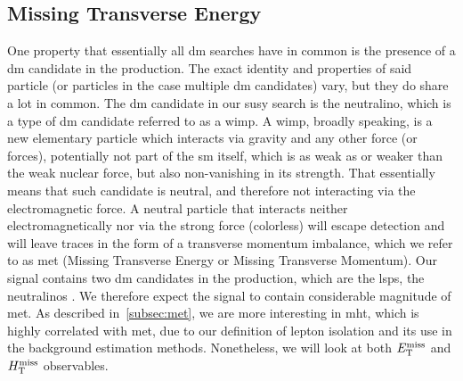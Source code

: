 \subsection{Missing Transverse Energy}
\label{subsec:signal-met-mht}
One property that essentially all \gls{dm} searches have in common is the presence of a \gls{dm} candidate in the production. The exact identity and properties of said particle (or particles in the case multiple \gls{dm}  candidates) vary, but they do share a lot in common. The \gls{dm} candidate in our \gls{susy} search is the \gls{neutralino}, which is a type of \gls{dm} candidate referred to as a \gls{wimp}. A \gls{wimp}, broadly speaking, is a new elementary particle which interacts via gravity and any other force (or forces), potentially not part of the \gls{sm} itself, which is as weak as or weaker than the weak nuclear force, but also non-vanishing in its strength. That essentially means that such candidate is neutral, and therefore not interacting via the electromagnetic force. A neutral particle that interacts neither electromagnetically nor via the strong force (\ie colorless) will escape detection and will leave traces in the form of a transverse momentum imbalance, which we refer to as \gls{met} (Missing Transverse Energy or Missing Transverse Momentum). Our signal contains two \gls{dm} candidates in the production, which are the \glspl{lsp}, the \glspl{neutralino} \neuto. We therefore expect the signal to contain considerable magnitude of \gls{met}. As described in~\ref{subsec:met},  we are more interesting in \gls{mht}, which is highly correlated with \gls{met}, due to our definition of lepton isolation and its use in the background estimation methods. Nonetheless, we will look at both $E_{\mathrm{T}}^{\text{miss}}$ and $H_{\mathrm{T}}^{\text{miss}}$ observables.
